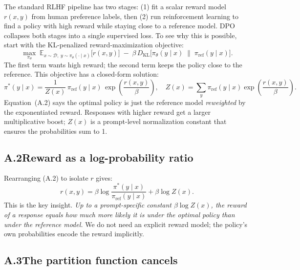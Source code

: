 \documentclass[11pt]{article}
\begin{document}
The standard RLHF pipeline has two stages: (1) fit a scalar reward model \(r(x,y)\) from human preference labels, then (2) run reinforcement learning to find a policy with high reward while staying close to a reference model.  DPO collapses both stages into a single supervised loss.  To see why this is possible, start with the KL-penalized reward-maximization objective:
\begin{equation*}\tag{A.1}
\max_{\pi_\theta}\;
\mathbb{E}_{x \sim \mathcal{D},\; y \sim \pi_\theta(\cdot \mid x)}
\bigl[r(x,y)\bigr]
\;-\;
\beta\, D_{\mathrm{KL}}\!\bigl[\pi_\theta(y \mid x) \;\|\; \pi_{\mathrm{ref}}(y \mid x)\bigr].
\end{equation*}
The first term wants high reward; the second term keeps the policy close to the reference.  This objective has a closed-form solution:
\begin{equation*}\tag{A.2}
\pi^*(y \mid x)
=
\frac{1}{Z(x)}\,
\pi_{\mathrm{ref}}(y \mid x)\,
\exp\!\left(\frac{r(x,y)}{\beta}\right),
\quad
Z(x) = \sum_{y} \pi_{\mathrm{ref}}(y \mid x)\exp\!\left(\frac{r(x,y)}{\beta}\right).
\end{equation*}
Equation~(A.2) says the optimal policy is just the reference model \emph{reweighted} by the exponentiated reward.  Responses with higher reward get a larger multiplicative boost; \(Z(x)\) is a prompt-level normalization constant that ensures the probabilities sum to 1.

\subsection*{A.2\quad Reward as a log-probability ratio}

Rearranging (A.2) to isolate \(r\) gives:
\begin{equation*}\tag{A.3}
r(x, y)
=
\beta \log \frac{\pi^*(y \mid x)}{\pi_{\mathrm{ref}}(y \mid x)}
+
\beta \log Z(x).
\end{equation*}
This is the key insight.  \emph{Up to a prompt-specific constant \(\beta \log Z(x)\), the reward of a response equals how much more likely it is under the optimal policy than under the reference model.}  We do not need an explicit reward model; the policy's own probabilities encode the reward implicitly.

\subsection*{A.3\quad The partition function cancels}
\end{document}
